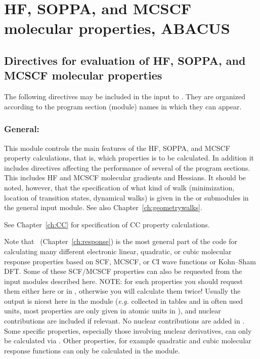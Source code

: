 \chapter{HF, SOPPA, and MCSCF molecular properties, ABACUS}\label{ch:abacus}

\section{Directives for evaluation of HF, SOPPA, and MCSCF molecular properties}
\label{sec:abainp}

  The following directives may be included in the input to \aba.
They are organized according to the program section (module) names
in which they can appear.

\subsection{General: }\label{subsec:abacus}

This module controls the main features of the HF, SOPPA, and MCSCF property calculations,
that is, which properties is to be calculated.
In addition it includes
directives affecting the performance of several of the program
sections.
This includes HF and MCSCF molecular gradients and Hessians.
It should be noted, however, that the specification of what
kind of walk (minimization, location of
transition states, dynamical  
walks) is given in the  or 
submodules in the general input  module. See also Chapter~\ref{ch:geometrywalks}. 

See Chapter~\ref{ch:CC} for specification of CC property calculations.

Note that \resp\ (Chapter~\ref{ch:response})
is the most general part of the code for calculating
many different electronic linear, quadratic, or cubic molecular
response properties based on SCF, MCSCF, or CI wave functions or Kohn--Sham DFT.
Some of these SCF/MCSCF properties can also be requested
from the  input modules described here.
NOTE: for such properties you should request them either here or
in , otherwise you will calculate them twice!
Usually the output is nicest here in
the  module ({\it e.g.\/} collected in tables and in
often used units, most properties are only given in atomic
units in \resp), and nuclear contributions are included if relevant.
No nuclear contributions are added in \resp .
Some specific properties, especially those involving nuclear derivatives,
can only be calculated via .
Other properties, for example quadratic and cubic molecular response functions
can only be calculated in the  module.


